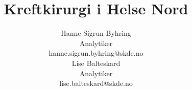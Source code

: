 \usepackage{xcolor}
\usepackage[norsk]{babel}

\usepackage[utf8]{inputenc}
\usepackage{libertine} %
\usepackage[T1]{fontenc}

\usepackage{parskip}

\usepackage{booktabs}


\usepackage{sectsty}
\allsectionsfont{\sffamily\color{skde}}

\usepackage{pdfpages} %




\makeatletter
\newcommand{\globalcolor}[1]{%
  \color{#1}\global\let\default@color\current@color
}
\makeatother

\AtBeginDocument{\globalcolor{text}}

\usepackage{framed,color}

\renewcommand{\textfraction}{0.05}
\renewcommand{\topfraction}{0.8}
\renewcommand{\bottomfraction}{0.8}
\renewcommand{\floatpagefraction}{0.75}

\title{Kreftkirurgi i Helse Nord} %
\newcommand{\sammendrag}{Dette notatet gir en oversikt over hvilke institusjoner som utfører %
kreftkirurgi i Helse Nord RHF og omfanget av disse inngrepene i perioden 2013 til 2016, basert på tall fra Norsk pasientregister.} %
\newcommand{\notatnummer}{\today} %
\author{%
   	Hanne Sigrun Byhring \\
    Analytiker \\
    hanne.sigrun.byhring@skde.no\vspace{20pt} \\
    Lise Balteskard \\
    Analytiker \\
    lise.balteskard@skde.no
}

\newcommand{\hoydestrek}{125pt} %

\usepackage{amsmath}
\usepackage{tikz}
\usepackage{epigraph}


